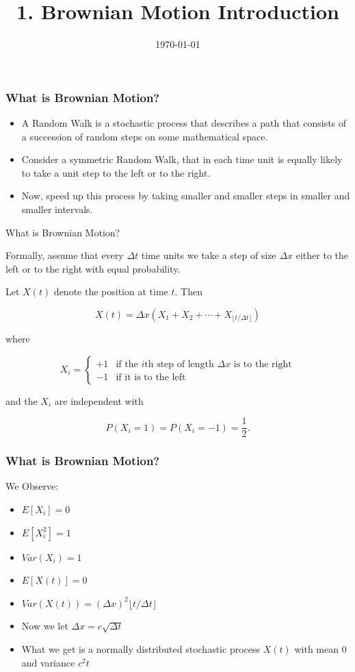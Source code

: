 \documentclass{beamer}
\title{1. Brownian Motion Introduction}
\date{\today}
\begin{document}
\begin{frame}
  \titlepage
\end{frame}

\begin{frame}
\frametitle{What is Brownian Motion?}
\begin{itemize}[<+->]
\item A Random Walk is a stochastic process that describes a path that consists of a succession of random steps on some mathematical space. 
\item Consider a symmetric Random Walk, that in each time unit is equally likely to take a unit step to the left or to the right. 
\item Now, speed up this process by taking smaller and smaller steps in smaller and smaller intervals.
\end{itemize}
\end{frame}

\begin{frame}{What is Brownian Motion?}

Formally, assume that every $\Delta t$ time units we take a step 
of size $\Delta x$ either to the left or to the right with equal probability.

Let $X(t)$ denote the position at time $t$. Then

\[
X(t) = \Delta x \left(X_1 + X_2 + \cdots + X_{\lfloor t/\Delta t \rfloor}\right)
\]

where

\[
X_i =
\begin{cases}
+1 & \text{if the $i$th step of length $\Delta x$ is to the right} \\
-1 & \text{if it is to the left}
\end{cases}
\]

and the $X_i$ are independent with

\[
P(X_i = 1) = P(X_i = -1) = \frac{1}{2}.
\]

\end{frame}

\begin{frame}
\frametitle{What is Brownian Motion?}
We Observe:
\begin{itemize}[<+->]
  \item $E[X_i] = 0$
  \item $E[X_i^2] = 1$
  \item $Var(X_i) = 1$
  \item $E[X(t)] = 0$
  \item $Var(X(t)) = (\Delta x)^2 \lfloor t/\Delta t \rfloor$
  \item Now we let $\Delta x = c\sqrt{\Delta t}$
  \item What we get is a normally distributed stochastic process $X(t)$ with mean $0$ and variance $c^2 t$
\end{itemize}
\end{frame}
\end{document}
